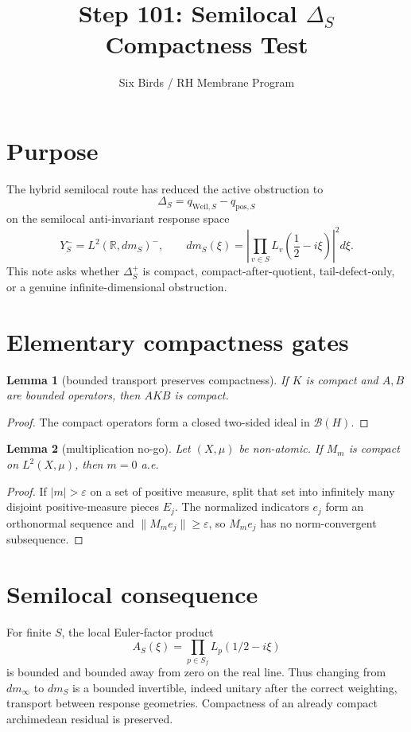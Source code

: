 \documentclass[11pt]{article}
\title{Step 101: Semilocal $\Delta_S$ Compactness Test}
\author{Six Birds / RH Membrane Program}
\date{}
\newtheorem{lemma}{Lemma}
\begin{document}
\maketitle

\section{Purpose}
The hybrid semilocal route has reduced the active obstruction to
\[
  \Delta_S=q_{\mathrm{Weil},S}-q_{\mathrm{pos},S}
\]
on the semilocal anti-invariant response space
\[
  Y_S^- = L^2(\mathbb R,dm_S)^-, \qquad
  dm_S(\xi)=\left|\prod_{v\in S}L_v\left(\frac12-i\xi\right)\right|^2d\xi .
\]
This note asks whether $\Delta_S^+$ is compact, compact-after-quotient, tail-defect-only, or a genuine infinite-dimensional obstruction.

\section{Elementary compactness gates}
\begin{lemma}[bounded transport preserves compactness]
If $K$ is compact and $A,B$ are bounded operators, then $AKB$ is compact.
\end{lemma}
\begin{proof}
The compact operators form a closed two-sided ideal in $\mathcal B(H)$.
\end{proof}

\begin{lemma}[multiplication no-go]
Let $(X,\mu)$ be non-atomic. If $M_m$ is compact on $L^2(X,\mu)$, then $m=0$ a.e.
\end{lemma}
\begin{proof}
If $|m|>\varepsilon$ on a set of positive measure, split that set into infinitely many disjoint positive-measure pieces $E_j$. The normalized indicators $e_j$ form an orthonormal sequence and $\|M_m e_j\|\ge\varepsilon$, so $M_m e_j$ has no norm-convergent subsequence.
\end{proof}

\section{Semilocal consequence}
For finite $S$, the local Euler-factor product
\[
  A_S(\xi)=\prod_{p\in S_f}L_p(1/2-i\xi)
\]
is bounded and bounded away from zero on the real line. Thus changing from $dm_\infty$ to $dm_S$ is a bounded invertible, indeed unitary after the correct weighting, transport between response geometries. Compactness of an already compact archimedean residual is preserved.
\end{document}
